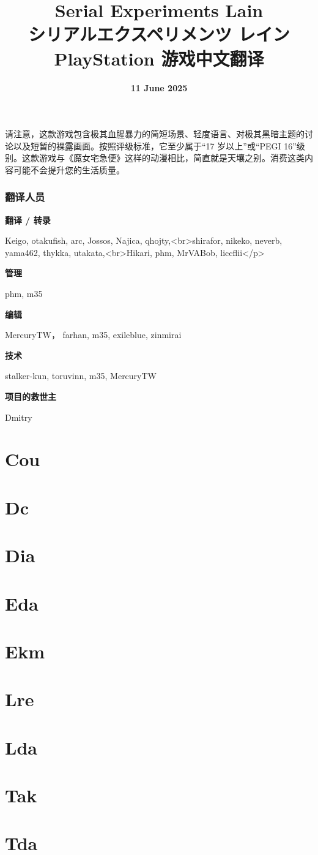 \documentclass{article}
\title{\textbf{{\LARGE Serial Experiments Lain \\ シリアルエクスペリメンツ レイン\\ PlayStation 游戏中文翻译}}}
\author{}
\date{\textbf{11 June 2025}}
\begin{document}
\maketitle

\vfill
\begin{center}
请注意，这款游戏包含极其血腥暴力的简短场景、轻度语言、对极其黑暗主题的讨论以及短暂的裸露画面。按照评级标准，它至少属于“17 岁以上”或“PEGI 16”级别。这款游戏与《魔女宅急便》这样的动漫相比，简直就是天壤之别。消费这类内容可能不会提升您的生活质量。
\end{center}

\newpage

\tableofcontents

\newpage

\section{\textbf{翻译人员}}

{\Large \textbf{翻译 / 转录}}

Keigo, otakufish, arc, Jossos, Najica, qhojty,<br>shirafor, nikeko, neverb, yama462, thykka, utakata,<br>Hikari, phm, MrVABob, liccflii</p>

{\Large \textbf{管理}}

phm, m35

{\Large \textbf{编辑}}

MercuryTW， farhan, m35, exileblue, zinmirai

{\Large \textbf{技术}}

stalker-kun, toruvinn, m35, MercuryTW

{\Large \textbf{项目的救世主}}

Dmitry


\part{Cou}



\part{Dc}

\part{Dia}

\part{Eda}

\part{Ekm}

\part{Lre}

\part{Lda}

\part{Tak}

\part{Tda}
\end{document}
